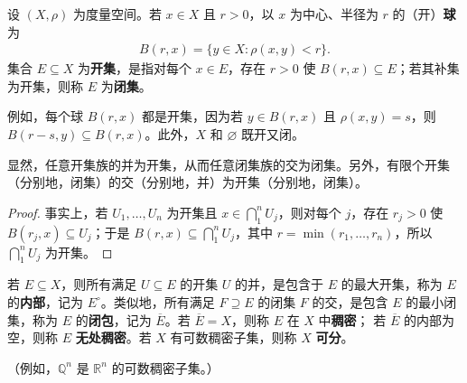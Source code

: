 \documentclass[../../main.tex]{subfiles}%
\begin{document}

\begin{definition}[开球、开集与闭集]\label{definition:ch00-balls-open-closed}
设 $(X,\rho)$ 为度量空间。若 $x\in X$ 且 $r>0$，以 $x$ 为中心、半径为 $r$ 的（开）\textbf{球}为
\begin{align*}
B(r,x)=\{y\in X:\rho(x,y)<r\}.
\end{align*}
集合 $E\subseteq X$ 为\textbf{开集}，是指对每个 $x\in E$，存在 $r>0$ 使 $B(r,x)\subseteq E$；若其补集为开集，则称 $E$ 为\textbf{闭集}。
\end{definition}

\begin{example}\label{example:ch00-balls-open-example}
例如，每个球 $B(r,x)$ 都是开集，因为若 $y\in B(r,x)$ 且 $\rho(x,y)=s$，则 $B(r-s,y)\subseteq B(r,x)$。此外，$X$ 和 $\varnothing$ 既开又闭。
\end{example}

\begin{proposition}\label{proposition:ch00-open-closed-operations}
显然，任意开集族的并为开集，从而任意闭集族的交为闭集。另外，有限个开集（分别地，闭集）的交（分别地，并）为开集（分别地，闭集）。
\end{proposition}

\begin{proof}
事实上，若 $U_1,\ldots,U_n$ 为开集且 $x\in\bigcap_1^nU_j$，则对每个 $j$，存在 $r_j>0$ 使 $B(r_j,x)\subseteq U_j$；于是 $B(r,x)\subseteq\bigcap_1^nU_j$，其中 $r=\min(r_1,\ldots,r_n)$，所以 $\bigcap_1^nU_j$ 为开集。
\end{proof}



\begin{definition}[内部、闭包与稠密性]\label{definition:ch00-interior-closure}
若 $E\subseteq X$，则所有满足 $U\subseteq E$ 的开集 $U$ 的并，是包含于 $E$ 的最大开集，称为 $E$ 的\textbf{内部}，记为 $E^\circ$。类似地，所有满足 $F\supseteq E$ 的闭集 $F$ 的交，是包含 $E$ 的最小闭集，称为 $E$ 的\textbf{闭包}，记为 $\overline{E}$。若 $\overline{E}=X$，则称 $E$ 在 $X$ 中\textbf{稠密}；
若 $\overline{E}$ 的内部为空，则称 $E$ \textbf{无处稠密}。若 $X$ 有可数稠密子集，则称 $X$ \textbf{可分}。
\end{definition}

\begin{example}\label{example:ch00-rational-dense-example}
（例如，$\mathbb{Q}^n$ 是 $\mathbb{R}^n$ 的可数稠密子集。）
\end{example}
\end{document}
